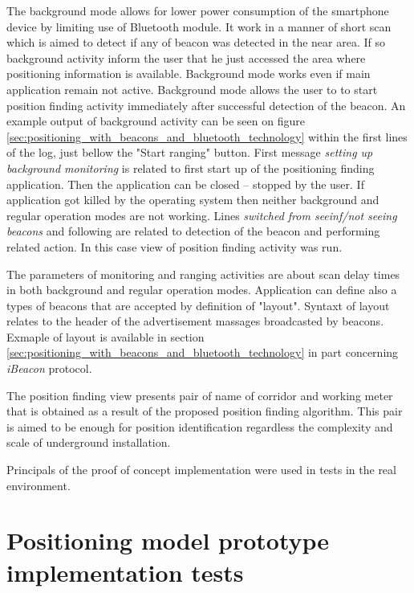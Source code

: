 \documentclass[../main.tex]{subfiles}
\begin{document}
The background mode allows for lower power consumption of the smartphone device by limiting use of Bluetooth module. It work in a manner of short scan which is aimed to detect if any of beacon was detected in the near area. If so background activity inform the user that he just accessed the area where positioning information is available. Background mode works even if main application remain not active. Background mode allows the user to to start position finding activity immediately after successful detection of the beacon. An example output of background activity can be seen on figure \ref{sec:positioning_with_beacons_and_bluetooth_technology} within the first lines of the log, just bellow the "Start ranging" button. First message \textit{setting up background monitoring} is related to first start up of the positioning finding application. Then the application can be closed -- stopped by the user. If application got killed by the operating system then neither background and regular operation modes are not working. Lines \textit{switched from seeinf/not seeing beacons} and following are related to detection of the beacon and performing related action. In this case view of position finding activity was run.

The parameters of monitoring and ranging activities are about scan delay times in both background and regular operation modes. Application can define also a types of beacons that are accepted by definition of "layout". Syntaxt of layout relates to the header of the advertisement massages broadcasted by beacons. Exmaple of layout is available in section \ref{sec:positioning_with_beacons_and_bluetooth_technology} in part concerning \textit{iBeacon} protocol.

The position finding view presents pair of name of corridor and working meter that is obtained as a result of the proposed position finding algorithm. This pair is aimed to be enough for position identification regardless the complexity and scale of underground installation.

Principals of the proof of concept implementation were used in tests in the real environment.


\chapter{Positioning model prototype implementation tests}
\label{ch:localization_system_tests}
\end{document}
